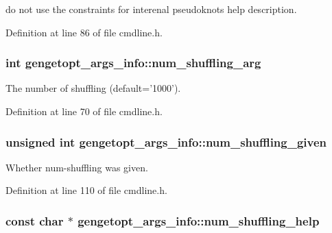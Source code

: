 do not use the constraints for interenal pseudoknots help description. 



Definition at line 86 of file cmdline.\+h.

\hypertarget{structgengetopt__args__info_a715feb4a7b63112c0029aca5bc3e0e15}{
\subsubsection[{num\+\_\+shuffling\+\_\+arg}]{\setlength{\rightskip}{0pt plus 5cm}int gengetopt\+\_\+args\+\_\+info\+::num\+\_\+shuffling\+\_\+arg}}\label{structgengetopt__args__info_a715feb4a7b63112c0029aca5bc3e0e15}


The number of shuffling (default='1000'). 



Definition at line 70 of file cmdline.\+h.

\hypertarget{structgengetopt__args__info_a39aafdd42c0bbbd0cf11b6e6506aa6fe}{
\subsubsection[{num\+\_\+shuffling\+\_\+given}]{\setlength{\rightskip}{0pt plus 5cm}unsigned int gengetopt\+\_\+args\+\_\+info\+::num\+\_\+shuffling\+\_\+given}}\label{structgengetopt__args__info_a39aafdd42c0bbbd0cf11b6e6506aa6fe}


Whether num-\/shuffling was given. 



Definition at line 110 of file cmdline.\+h.

\hypertarget{structgengetopt__args__info_a8fa7a97053908512f7fb0078b95a7b8f}{
\subsubsection[{num\+\_\+shuffling\+\_\+help}]{\setlength{\rightskip}{0pt plus 5cm}const char $\ast$ gengetopt\+\_\+args\+\_\+info\+::num\+\_\+shuffling\+\_\+help}}\label{structgengetopt__args__info_a8fa7a97053908512f7fb0078b95a7b8f}


